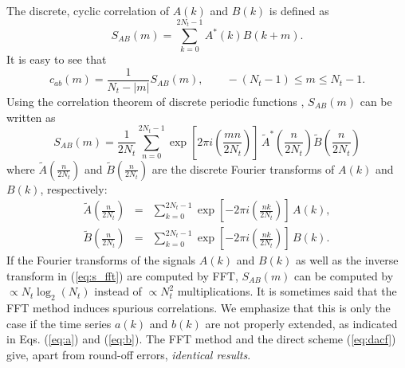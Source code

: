 \documentclass[a4paper,11pt]{article}
\begin{document}
\begin{appendices}
The discrete, cyclic correlation of $A(k)$ and $B(k)$ is defined as
\begin{equation}
\label{eq:s}
S_{AB}(m) = \sum_{k=0}^{2N_t-1} A^*(k)B(k+m).
\end{equation}
It is easy to see that
\begin{equation}
\label{eq:c-s}
c_{ab}(m) = \frac{1}{N_t-|m|}S_{AB}(m),\qquad -(N_t-1) \le m \le N_t-1.
\end{equation}
Using the correlation theorem of discrete periodic functions
\cite{Brigham}, $S_{AB}(m)$ can be written as
\begin{equation}
\label{eq:s_fft}
S_{AB}(m) = \frac{1}{2N_t}\sum_{n=0}^{2N_t-1} 
\exp\left[2\pi i\left(\frac{mn}{2N_t}\right)\right]\,
\tilde A^*\left(\frac{n}{2N_t}\right)\tilde B\left(\frac{n}{2N_t}\right)
\end{equation}
where $\tilde A\left(\frac{n}{2N_t}\right)$ and $\tilde
B\left(\frac{n}{2N_t}\right)$ are the discrete  Fourier transforms of
$A(k)$ and $B(k)$, respectively:
\begin{eqnarray}
\tilde A\left(\frac{n}{2N_t}\right) &=
&\sum_{k=0}^{2N_t-1} \exp\left[-2\pi i\left(\frac{n k}{2N_t}\right)\right]
\,A(k),\\
\tilde B\left(\frac{n}{2N_t}\right) &=
&\sum_{k=0}^{2N_t-1} \exp\left[-2\pi i\left(\frac{n k}{2N_t}\right)\right]
\,B(k).
\end{eqnarray}
If the Fourier transforms of the signals $A(k)$ and $B(k)$ as well as
the inverse transform in (\ref{eq:s_fft}) are computed by \gls{FFT},
$S_{AB}(m)$ can be computed by $\propto N_t\log_2(N_t)$ instead of
$\propto N_t^2$ multiplications. It is sometimes said that the \gls{FFT}
method induces spurious correlations. We emphasize that this is only
the case if the time series $a(k)$ and $b(k)$ are not properly
extended, as indicated in Eqs. (\ref{eq:a}) and (\ref{eq:b}). The \gls{FFT}
method and the direct scheme (\ref{eq:dacf}) give, apart from
round-off errors, \textit{identical results}.


\end{appendices}
\end{document}

